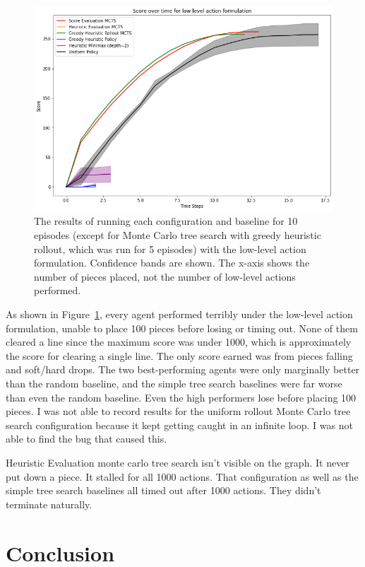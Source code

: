 \documentclass[letterpaper]{article} %
\begin{document}
\begin{figure}[t]
  \centering
  \includegraphics[width=\columnwidth]{LL.png}
  \caption{The results of running each configuration and baseline for 10 episodes (except for Monte Carlo tree search with greedy heuristic rollout, which was run for 5 episodes) with the low-level action formulation. Confidence bands are shown. The x-axis shows the number of pieces placed, not the number of low-level actions performed.}\label{figll}
\end{figure}

As shown in Figure~\ref{figll}, every agent performed terribly under the low-level action formulation, unable to place 100 pieces before losing or timing out. None of them cleared a line since the maximum score was under 1000, which is approximately the score for clearing a single line. The only score earned was from pieces falling and soft/hard drops. The two best-performing agents were only marginally better than the random baseline, and the simple tree search baselines were far worse than even the random baseline. Even the high performers lose before placing 100 pieces. I was not able to record results for the uniform rollout Monte Carlo tree search configuration because it kept getting caught in an infinite loop. I was not able to find the bug that caused this.

Heuristic Evaluation monte carlo tree search isn't visible on the graph. It never put down a piece. It stalled for all 1000 actions. That configuration as well as the simple tree search baselines all timed out after 1000 actions. They didn't terminate naturally.

\section{Conclusion}
\end{document}
